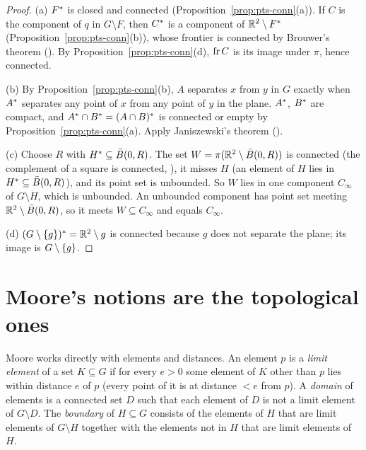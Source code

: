 \begin{proof}
(a) $F^{\ast}$ is closed and connected (Proposition~\ref{prop:pts-conn}(a)). If $C$ is the component of
$q$ in $G\setminus F$, then $C^{\ast}$ is a component of $\mathbb{R}^2\setminus F^{\ast}$ (Proposition~\ref{prop:pts-conn}(b)),
whose frontier is connected by Brouwer's theorem (). By
Proposition~\ref{prop:pts-conn}(d), $\operatorname{fr} C$ is its image under $\pi$, hence connected.

(b) By Proposition~\ref{prop:pts-conn}(b), $A$ separates $x$ from $y$ in $G$ exactly when $A^{\ast}$
separates any point of $x$ from any point of $y$ in the plane. $A^{\ast}$, $B^{\ast}$ are compact, and
$A^{\ast}\cap B^{\ast}=(A\cap B)^{\ast}$ is connected or empty by Proposition~\ref{prop:pts-conn}(a).
Apply Janiszewski's theorem ().

(c) Choose $R$ with $H^{\ast}\subseteq\bar B(0,R)$. The set $W=\pi(\mathbb{R}^2\setminus\bar B(0,R))$ is
connected (the complement of a square is connected, ), it misses $H$ (an element of
$H$ lies in $H^{\ast}\subseteq\bar B(0,R)$), and its point set is unbounded. So $W$ lies in one
component $C_\infty$ of $G\setminus H$, which is unbounded. An unbounded component has point set
meeting $\mathbb{R}^2\setminus\bar B(0,R)$, so it meets $W\subseteq C_\infty$ and equals $C_\infty$.

(d) $(G\setminus\left\{ g \right\})^{\ast}=\mathbb{R}^2\setminus g$ is connected because $g$ does not separate the plane;
its image is $G\setminus\left\{ g \right\}$.
\end{proof}


\section{Moore's notions are the topological ones}

Moore works directly with elements and distances. An element $p$ is a \emph{limit element} of a set
$K\subseteq G$ if for every $e>0$ some element of $K$ other than $p$ lies within distance $e$ of $p$
(every point of it is at distance $<e$ from $p$). A \emph{domain} of elements is a connected set $D$
such that each element of $D$ is not a limit element of $G\setminus D$. The \emph{boundary} of
$H\subseteq G$ consists of the elements of $H$ that are limit elements of $G\setminus H$ together with
the elements not in $H$ that are limit elements of $H$.

